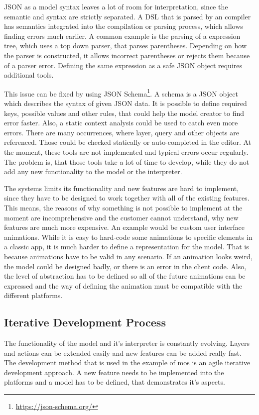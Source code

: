 \ac{JSON} as a model syntax leaves a lot of room for interpretation, since the semantic and syntax are strictly separated.
A \ac{DSL} that is parsed by an compiler has semantics integrated into the compilation or parsing process, which allows finding errors much earlier.
A common example is the parsing of a expression tree, which uses a top down parser, that parses parentheses.
Depending on how the parser is constructed, it allows incorrect parentheses or rejects them because of a parser error.
Defining the same expression as a safe \ac{JSON} object requires additional tools.

This issue can be fixed by using \ac{JSON} Schema\footnote{\url{https://json-schema.org/}}.
A schema is a \ac{JSON} object which describes the syntax of given \ac{JSON} data.
It is possible to define required keys, possible values and other rules, that could help the model creator to find error faster.
Also, a static context analysis could be used to catch even more errors.
There are many occurrences, where layer, query and other objects are referenced.
Those could be checked statically or auto-completed in the editor.
At the moment, these tools are not implemented and typical errors occur regularly.
The problem is, that those tools take a lot of time to develop, while they do not add any new functionality to the model or the interpreter.

The systems limits its functionality and new features are hard to implement, since they have to be designed to work together with all of the existing features.
This means, the reasons of why something is not possible to implement at the moment are incomprehensive and the customer cannot understand, why new features are much more expensive.
An example would be custom user interface animations.
While it is easy to hard-code some animations to specific elements in a classic app, it is much harder to define a representation for the model.
That is because animations have to be valid in any scenario.
If an animation looks weird, the model could be designed badly, or there is an error in the client code.
Also, the level of abstraction has to be defined so all of the future animations can be expressed and the way of defining the animation must be compatible with the different platforms.

%
\subsection{Iterative Development Process}


The functionality of the model and it's interpreter is constantly evolving.
Layers and actions can be extended easily and new features can be added really fast.
The development method that is used in the example of mos is an agile iterative development approach.
A new feature needs to be implemented into the platforms and a model has to be defined, that demonstrates it's aspects.

